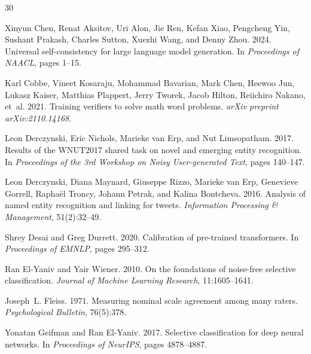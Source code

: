 \documentclass[11pt,a4paper]{article}
\begin{document}
\begin{thebibliography}{30}

Xinyun Chen, Renat Aksitov, Uri Alon, Jie Ren, Kefan Xiao, Pengcheng Yin, Sushant Prakash, Charles Sutton, Xuezhi Wang, and Denny Zhou. 2024.
\newblock Universal self-consistency for large language model generation.
\newblock In \emph{Proceedings of NAACL}, pages 1--15.

Karl Cobbe, Vineet Kosaraju, Mohammad Bavarian, Mark Chen, Heewoo Jun, Lukasz Kaiser, Matthias Plappert, Jerry Tworek, Jacob Hilton, Reiichiro Nakano, et~al. 2021.
\newblock Training verifiers to solve math word problems.
\newblock \emph{arXiv preprint arXiv:2110.14168}.

Leon Derczynski, Eric Nichols, Marieke van Erp, and Nut Limsopatham. 2017.
\newblock Results of the {WNUT}2017 shared task on novel and emerging entity recognition.
\newblock In \emph{Proceedings of the 3rd Workshop on Noisy User-generated Text}, pages 140--147.

Leon Derczynski, Diana Maynard, Giuseppe Rizzo, Marieke van Erp, Genevieve Gorrell, Rapha{\"e}l Troncy, Johann Petrak, and Kalina Bontcheva. 2016.
\newblock Analysis of named entity recognition and linking for tweets.
\newblock \emph{Information Processing \& Management}, 51(2):32--49.

Shrey Desai and Greg Durrett. 2020.
\newblock Calibration of pre-trained transformers.
\newblock In \emph{Proceedings of EMNLP}, pages 295--312.

Ran El-Yaniv and Yair Wiener. 2010.
\newblock On the foundations of noise-free selective classification.
\newblock \emph{Journal of Machine Learning Research}, 11:1605--1641.

Joseph~L. Fleiss. 1971.
\newblock Measuring nominal scale agreement among many raters.
\newblock \emph{Psychological Bulletin}, 76(5):378.

Yonatan Geifman and Ran El-Yaniv. 2017.
\newblock Selective classification for deep neural networks.
\newblock In \emph{Proceedings of NeurIPS}, pages 4878--4887.


\end{thebibliography}
\end{document}
